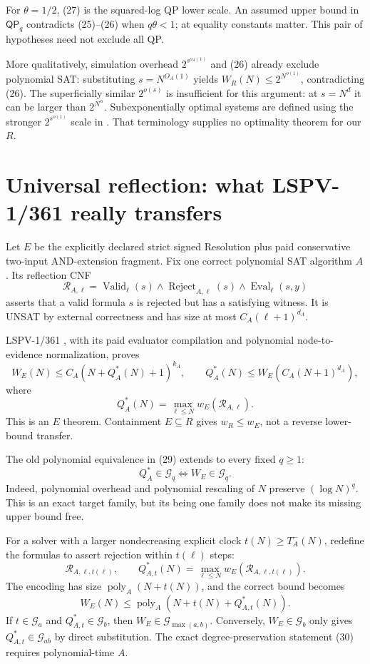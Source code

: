 \documentclass[11pt]{article}
\newcommand{\poly}{\operatorname{poly}}
\newcommand{\QP}{\mathsf{QP}}
\begin{document}
For $\theta=1/2$, (27) is the squared-log QP lower scale. An assumed upper
bound in $\QP_q$ contradicts (25)--(26) when $q\theta<1$; at equality
constants matter. This pair of hypotheses need not exclude all QP.

More qualitatively, simulation overhead $2^{s^{o_A(1)}}$ and (26)
already exclude polynomial SAT: substituting $s=N^{O_A(1)}$ yields
$W_R(N)\le2^{N^{o(1)}}$, contradicting (26).
The superficially similar $2^{o(s)}$ is insufficient for this argument:
at $s=N^d$ it can be larger than $2^{N^\alpha}$.
Subexponentially optimal systems are defined using the stronger
$2^{s^{o(1)}}$ scale in \cite[Definition 6.7]{ilango2025}.
That terminology supplies no optimality theorem for our $R$.

\section{Universal reflection: what LSPV-1/361 really transfers}

Let $E$ be the explicitly declared strict signed Resolution plus paid
conservative two-input AND-extension fragment. Fix one correct polynomial
SAT algorithm $A$. Its reflection CNF
\[
 \mathcal R_{A,\ell}
 =\operatorname{Valid}_{\ell}(s)\land
   \operatorname{Reject}_{A,\ell}(s)\land
   \operatorname{Eval}_{\ell}(s,y)
 \tag{28}
\]
asserts that a valid formula $s$ is rejected but has a satisfying witness.
It is UNSAT by external correctness and has size at most
$C_A(\ell+1)^{d_A}$.

LSPV-1/361 \cite{reflection361}, with its paid evaluator compilation and polynomial
node-to-evidence normalization, proves
\[
 W_E(N)\le C_A(N+Q_A^*(N)+1)^{k_A},
 \qquad
 Q_A^*(N)\le W_E(C_A(N+1)^{d_A}),
 \tag{29}
\]
where
\[
 Q_A^*(N)=\max_{\ell\le N}w_E(\mathcal R_{A,\ell}).
\]
This is an $E$ theorem. Containment $E\subseteq R$ gives $w_R\le w_E$,
not a reverse lower-bound transfer.

The old polynomial equivalence in (29) extends to every fixed $q\ge1$:
\[
 Q_A^*\in\mathcal G_q\iff W_E\in\mathcal G_q.
 \tag{30}
\]
Indeed, polynomial overhead and polynomial rescaling of $N$ preserve
$(\log N)^q$. This is an exact target family, but its being one family
does not make its missing upper bound free.

For a solver with a larger nondecreasing explicit clock
$t(N)\ge T_A^-(N)$, redefine the formulas to assert rejection within
$t(\ell)$ steps:
\[
 \mathcal R_{A,\ell,t(\ell)},\qquad
 Q_{A,t}^*(N)=\max_{\ell\le N}
 w_E(\mathcal R_{A,\ell,t(\ell)}).
\]
The encoding has size $\poly_A(N+t(N))$, and the correct bound becomes
\[
 W_E(N)\le\poly_A(N+t(N)+Q_{A,t}^*(N)).
 \tag{31}
\]
If $t\in\mathcal G_a$ and $Q_{A,t}^*\in\mathcal G_b$, then
$W_E\in\mathcal G_{\max(a,b)}$.
Conversely, $W_E\in\mathcal G_b$ only gives
$Q_{A,t}^*\in\mathcal G_{ab}$ by direct substitution.
The exact degree-preservation statement (30) requires polynomial-time $A$.
\end{document}
